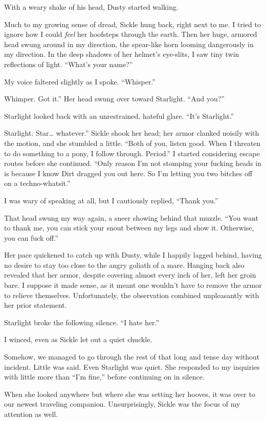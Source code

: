 With a weary shake of his head, Dusty started walking.

Much to my growing sense of dread, Sickle hung back, right next to me. I tried to ignore how I could \textit{feel} her hoofsteps through the earth. Then her huge, armored head swung around in my direction, the spear-like horn looming dangerously in my direction. In the deep shadows of her helmet’s eye-slits, I saw tiny twin reflections of light. “What’s your name?”

My voice faltered slightly as I spoke. “Whisper.”

\leavevmode{}Whimper. Got it.” Her head swung over toward Starlight. “And you?”

Starlight looked back with an unrestrained, hateful glare. “It’s Starlight.”

\leavevmode{}Starlight. Star… whatever.” Sickle shook her head; her armor clanked noisily with the motion, and she stumbled a little. “Both of you, listen good. When I threaten to do something to a pony, I follow through. Period.” I started considering escape routes before she continued. “Only reason I’m not stomping your fucking heads in is because I know Dirt dragged you out here. So I’m letting you two bitches off on a techno-whatsit.”

I was wary of speaking at all, but I cautiously replied, “Thank you.”

That head swung my way again, a sneer showing behind that muzzle. “You want to thank me, you can stick your snout between my legs and show it. Otherwise, you can fuck off.”

Her pace quickened to catch up with Dusty, while I happily lagged behind, having no desire to stay too close to the angry goliath of a mare. Hanging back also revealed that her armor, despite covering almost every inch of her, left her groin bare. I suppose it made sense, as it meant one wouldn’t have to remove the armor to relieve themselves. Unfortunately, the observation combined unpleasantly with her prior statement.

Starlight broke the following silence. “I hate her.”

I winced, even as Sickle let out a quiet chuckle.

{\br}%
Somehow, we managed to go through the rest of that long and tense day without incident. Little was said. Even Starlight was quiet. She responded to my inquiries with little more than “I’m fine,” before continuing on in silence.

When she looked anywhere but where she was setting her hooves, it was over to our newest traveling companion. Unsurprisingly, Sickle was the focus of my attention as well.

